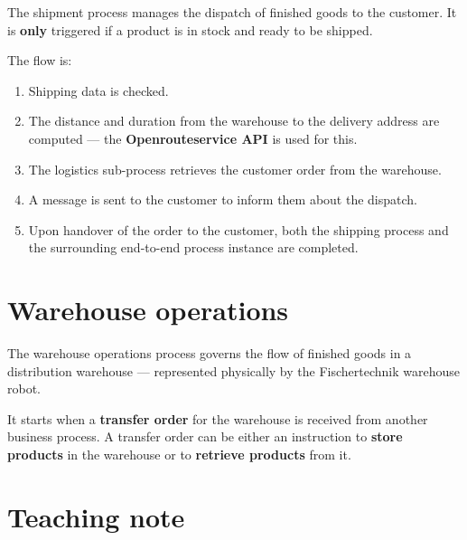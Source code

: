 \documentclass[
  english,
  11pt,
  a4paper,
]{scrbook}
\providecommand{\tightlist}{%
  \setlength{\itemsep}{0pt}\setlength{\parskip}{0pt}}
\begin{document}
The shipment process manages the dispatch of finished goods to the
customer. It is \textbf{only} triggered if a product is in stock and
ready to be shipped.

The flow is:

\begin{enumerate}
\def\labelenumi{\arabic{enumi}.}
\tightlist
\item
  Shipping data is checked.
\item
  The distance and duration from the warehouse to the delivery address
  are computed --- the \textbf{Openrouteservice API} is used for this.
\item
  The logistics sub-process retrieves the customer order from the
  warehouse.
\item
  A message is sent to the customer to inform them about the dispatch.
\item
  Upon handover of the order to the customer, both the shipping process
  and the surrounding end-to-end process instance are completed.
\end{enumerate}

\section{Warehouse operations}\label{warehouse-operations}

The warehouse operations process governs the flow of finished goods in a
distribution warehouse --- represented physically by the Fischertechnik
warehouse robot.

It starts when a \textbf{transfer order} for the warehouse is received
from another business process. A transfer order can be either an
instruction to \textbf{store products} in the warehouse or to
\textbf{retrieve products} from it.

\section{Teaching note}\label{teaching-note}
\end{document}

